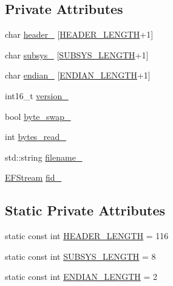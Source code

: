 \subsection*{Private Attributes}
\begin{DoxyCompactItemize}
\item 
char \hyperlink{classMatlabIO_a8eba798a14b97539bd81c1d34fcdcd1b}{header\+\_\+} \mbox{[}\hyperlink{classMatlabIO_af3e7951c954c76a502fe917a5438f102}{H\+E\+A\+D\+E\+R\+\_\+\+L\+E\+N\+G\+T\+H}+1\mbox{]}
\item 
char \hyperlink{classMatlabIO_a14f39bfe5a3e5877a606d2e176444b81}{subsys\+\_\+} \mbox{[}\hyperlink{classMatlabIO_a0c4219a61f9d82ce15e309bfce18bab9}{S\+U\+B\+S\+Y\+S\+\_\+\+L\+E\+N\+G\+T\+H}+1\mbox{]}
\item 
char \hyperlink{classMatlabIO_a506fbbf7c76a1de2714f5fdc8d8ce891}{endian\+\_\+} \mbox{[}\hyperlink{classMatlabIO_a1eea9aa8bc8c8d92d70f75d1f2280357}{E\+N\+D\+I\+A\+N\+\_\+\+L\+E\+N\+G\+T\+H}+1\mbox{]}
\item 
int16\+\_\+t \hyperlink{classMatlabIO_a73155405392e0c20d5098f462ebf405d}{version\+\_\+}
\item 
bool \hyperlink{classMatlabIO_a5b205de924e7d93cce1878b96e8090ef}{byte\+\_\+swap\+\_\+}
\item 
int \hyperlink{classMatlabIO_a4af107166f7a854356b85a8ba8e2a575}{bytes\+\_\+read\+\_\+}
\item 
std\+::string \hyperlink{classMatlabIO_ad28ac286cb3061ccba7362fc54a56187}{filename\+\_\+}
\item 
\hyperlink{classEFStream}{E\+F\+Stream} \hyperlink{classMatlabIO_a7a1ace952046269e5c04680a06db336a}{fid\+\_\+}
\end{DoxyCompactItemize}
\subsection*{Static Private Attributes}
\begin{DoxyCompactItemize}
\item 
static const int \hyperlink{classMatlabIO_af3e7951c954c76a502fe917a5438f102}{H\+E\+A\+D\+E\+R\+\_\+\+L\+E\+N\+G\+T\+H} = 116
\item 
static const int \hyperlink{classMatlabIO_a0c4219a61f9d82ce15e309bfce18bab9}{S\+U\+B\+S\+Y\+S\+\_\+\+L\+E\+N\+G\+T\+H} = 8
\item 
static const int \hyperlink{classMatlabIO_a1eea9aa8bc8c8d92d70f75d1f2280357}{E\+N\+D\+I\+A\+N\+\_\+\+L\+E\+N\+G\+T\+H} = 2
\end{DoxyCompactItemize}



